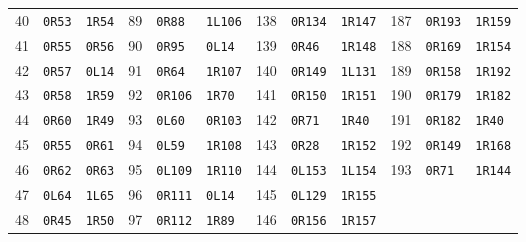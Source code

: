 \begin{center}
\begin{tabular}{@{}rll@{\quad}rll@{\quad}rll@{\quad}rll@{}}
40 & \texttt{0R53} & \texttt{1R54} & 89 & \texttt{0R88} & \texttt{1L106} & 138 & \texttt{0R134} & \texttt{1R147} & 187 & \texttt{0R193} & \texttt{1R159}\\
41 & \texttt{0R55} & \texttt{0R56} & 90 & \texttt{0R95} & \texttt{0L14} & 139 & \texttt{0R46} & \texttt{1R148} & 188 & \texttt{0R169} & \texttt{1R154}\\
42 & \texttt{0R57} & \texttt{0L14} & 91 & \texttt{0R64} & \texttt{1R107} & 140 & \texttt{0R149} & \texttt{1L131} & 189 & \texttt{0R158} & \texttt{1R192}\\
43 & \texttt{0R58} & \texttt{1R59} & 92 & \texttt{0R106} & \texttt{1R70} & 141 & \texttt{0R150} & \texttt{1R151} & 190 & \texttt{0R179} & \texttt{1R182}\\
44 & \texttt{0R60} & \texttt{1R49} & 93 & \texttt{0L60} & \texttt{0R103} & 142 & \texttt{0R71} & \texttt{1R40} & 191 & \texttt{0R182} & \texttt{1R40}\\
45 & \texttt{0R55} & \texttt{0R61} & 94 & \texttt{0L59} & \texttt{1R108} & 143 & \texttt{0R28} & \texttt{1R152} & 192 & \texttt{0R149} & \texttt{1R168}\\
46 & \texttt{0R62} & \texttt{0R63} & 95 & \texttt{0L109} & \texttt{1R110} & 144 & \texttt{0L153} & \texttt{1L154} & 193 & \texttt{0R71} & \texttt{1R144}\\
47 & \texttt{0L64} & \texttt{1L65} & 96 & \texttt{0R111} & \texttt{0L14} & 145 & \texttt{0L129} & \texttt{1R155} &  &  & \\
48 & \texttt{0R45} & \texttt{1R50} & 97 & \texttt{0R112} & \texttt{1R89} & 146 & \texttt{0R156} & \texttt{1R157} &  &  & \\
\bottomrule
\end{tabular}
\end{center}
\endgroup
